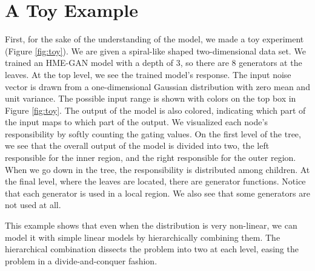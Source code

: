\documentclass[a4paper,onesided,12pt]{report}
\begin{document}
\section{A Toy Example}
\label{sec:toy}
First, for the sake of the understanding of the model, we made a toy experiment (Figure \ref{fig:toy}). We are given a spiral-like shaped two-dimensional data set. We trained an HME-GAN model with a depth of 3, so there are 8 generators at the leaves. At the top level, we see the trained model's response. The input noise vector is drawn from a one-dimensional Gaussian distribution with zero mean and unit variance. The possible input range is shown with colors on the top box in Figure \ref{fig:toy}. The output of the model is also colored, indicating which part of the input maps to which part of the output. We visualized each node's responsibility by softly counting the gating values. On the first level of the tree, we see that the overall output of the model is divided into two, the left responsible for the inner region, and the right responsible for the outer region. When we go down in the tree, the responsibility is distributed among children. At the final level, where the leaves are located, there are generator functions. Notice that each generator is used in a local region. We also see that some generators are not used at all.

This example shows that even when the distribution is very non-linear, we can model it with simple linear models by hierarchically combining them. The hierarchical combination dissects the problem into two at each level, easing the problem in a divide-and-conquer fashion.
\end{document}
